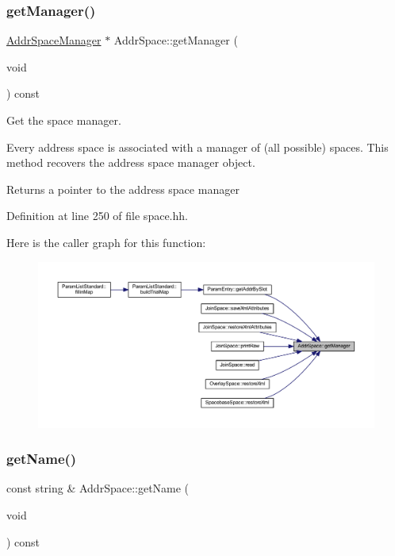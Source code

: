 \subsubsection{\texorpdfstring{getManager()}{getManager()}}
{\footnotesize\ttfamily \mbox{\hyperlink{class_addr_space_manager}{Addr\+Space\+Manager}} $\ast$ Addr\+Space\+::get\+Manager (\begin{DoxyParamCaption}\item[{void}]{ }\end{DoxyParamCaption}) const\hspace{0.3cm}{\ttfamily [inline]}}



Get the space manager. 

Every address space is associated with a manager of (all possible) spaces. This method recovers the address space manager object. \begin{DoxyReturn}{Returns}
a pointer to the address space manager 
\end{DoxyReturn}


Definition at line 250 of file space.\+hh.

Here is the caller graph for this function\+:
\nopagebreak
\begin{figure}[H]
\begin{center}
\leavevmode
\includegraphics[width=350pt]{class_addr_space_a1274986fce0448a40a055fb2bcd7aeb1_icgraph}
\end{center}
\end{figure}
\mbox{\label{class_addr_space_a0ff86055617ff65ee8961b7c4e6caf98}} 
\subsubsection{\texorpdfstring{getName()}{getName()}}
{\footnotesize\ttfamily const string \& Addr\+Space\+::get\+Name (\begin{DoxyParamCaption}\item[{void}]{ }\end{DoxyParamCaption}) const\hspace{0.3cm}{\ttfamily [inline]}}



